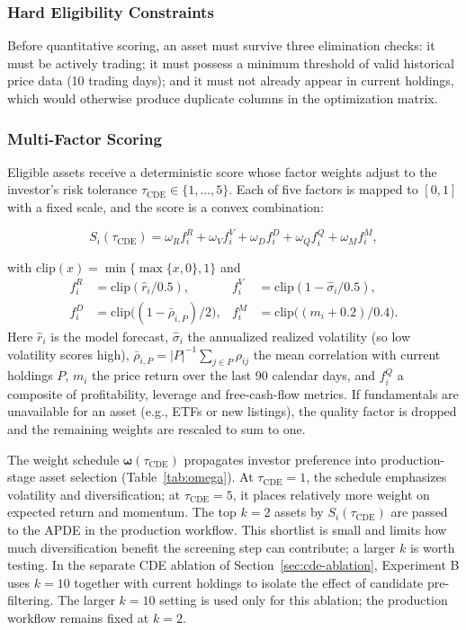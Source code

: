 \documentclass[conference]{IEEEtran}
\newcommand{\clip}{\mathrm{clip}}
\begin{document}
\subsubsection{Hard Eligibility Constraints}
Before quantitative scoring, an asset must survive three elimination
checks: it must be actively trading; it must possess a minimum
threshold of valid historical price data (10 trading days); and it
must not already appear in current holdings, which would otherwise
produce duplicate columns in the optimization matrix.

\subsubsection{Multi-Factor Scoring}
Eligible assets receive a deterministic score whose factor weights
adjust to the investor's risk tolerance $\tau_{\text{CDE}} \in
\{1,\dots,5\}$. Each of five factors is mapped to $[0,1]$ with a fixed
scale, and the score is a convex combination:

\begin{equation}
S_i(\tau_{\text{CDE}}) = \omega_R f^R_i + \omega_V f^V_i
  + \omega_D f^D_i + \omega_Q f^Q_i + \omega_M f^M_i ,
\label{eq:cde}
\end{equation}

with $\clip(x)=\min\{\max\{x,0\},1\}$ and
\begin{align*}
f^R_i &= \clip(\hat{r}_i/0.5), &
f^V_i &= \clip(1-\hat{\sigma}_i/0.5),\\
f^D_i &= \clip\!\big((1-\bar{\rho}_{i,P})/2\big), &
f^M_i &= \clip\!\big((m_i+0.2)/0.4\big).
\end{align*}
Here $\hat{r}_i$ is the model forecast, $\hat{\sigma}_i$ the annualized
realized volatility (so low volatility scores high),
$\bar{\rho}_{i,P} = |P|^{-1}\sum_{j \in P}\rho_{ij}$ the mean
correlation with current holdings $P$, $m_i$ the price return over the
last 90 calendar days, and $f^Q_i$ a composite of profitability,
leverage and free-cash-flow metrics. If fundamentals are unavailable
for an asset (e.g., ETFs or new listings), the quality factor is
dropped and the remaining weights are rescaled to sum to one.

The weight schedule $\boldsymbol{\omega}(\tau_{\text{CDE}})$ propagates
investor preference into production-stage asset selection
(Table~\ref{tab:omega}). At $\tau_{\text{CDE}}=1$, the schedule
emphasizes volatility and diversification; at $\tau_{\text{CDE}}=5$,
it places relatively more weight on expected return and momentum. The
top $k=2$ assets by $S_i(\tau_{\text{CDE}})$ are passed to the APDE in
the production workflow. This shortlist is small and limits how much
diversification benefit the screening step can contribute; a larger $k$
is worth testing. In the separate CDE ablation of Section~\ref{sec:cde-ablation},
Experiment B uses $k=10$ together with current holdings to isolate the effect
of candidate pre-filtering. The larger $k=10$ setting is used only for this
ablation; the production workflow remains fixed at $k=2$.
\end{document}
